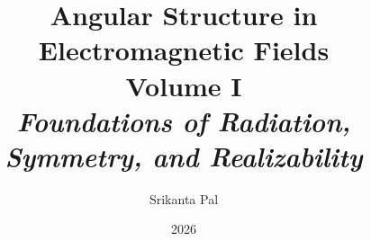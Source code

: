 

\title{Angular Structure in Electromagnetic Fields\\[0.75em]
  {\large Volume I}\\[0.5em]
  {\large\itshape Foundations of Radiation, Symmetry, and Realizability}}
\author{Srikanta Pal}
\date{2026}











\backmatter

\listoffigures
\listoftables
\appendix







